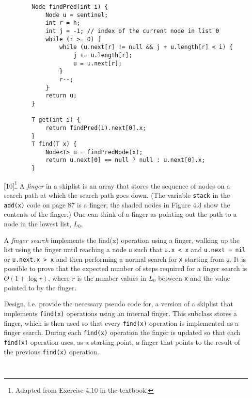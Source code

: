 \documentclass[addpoints]{exam}
\begin{document}
\begin{questions}
\begin{solution}
    \begin{verbatim}
        Node findPred(int i) {
            Node u = sentinel;
            int r = h;
            int j = -1; // index of the current node in list 0
            while (r >= 0) {
                while (u.next[r] != null && j + u.length[r] < i) {
                    j += u.length[r];
                    u = u.next[r];
                }
                r--;
            }
            return u;
        }
        
        T get(int i) {
            return findPred(i).next[0].x;
        }
        T find(T x) {
            Node<T> u = findPredNode(x);
            return u.next[0] == null ? null : u.next[0].x;
        }
    \end{verbatim}


    
  \end{solution}

  [10]\footnote{Adapted from Exercise 4.10 in the textbook.}
  A \textit{finger} in a skiplist is an array that stores the sequence of nodes on a search path at which the search path goes down. (The variable \texttt{stack} in the \texttt{add(x)} code on page 87 is a finger; the shaded nodes in Figure 4.3 show the contents of the finger.) One can think of a finger as pointing out the path to a node in the lowest list, $L_0$.

  A \textit{finger search} implements the find(x) operation using a finger, walking up the list using the finger until reaching a node \texttt{u} such that \texttt{u.x < x} and \texttt{u.next = nil} or \texttt{u.next.x > x} and then performing a normal search for \texttt{x} starting from \texttt{u}. It is possible to prove that the expected number of steps required for a finger search is $O(1+\log r)$, where $r$ is the number values in $L_0$ between \texttt{x} and the value pointed to by the finger.

  Design, i.e. provide the necessary pseudo code for, a version of a skiplist that implements \texttt{find(x)} operations using an internal finger. This subclass stores a finger, which is then used so that every \texttt{find(x)} operation is implemented as a finger search. During each \texttt{find(x)} operation the finger is updated so that each \texttt{find(x)} operation uses, as a starting point, a finger that points to the result of the previous \texttt{find(x)} operation.
  \begin{solution}
    \begin{verbatim}
        

\end{verbatim}
\end{solution}
\end{questions}
\end{document}
